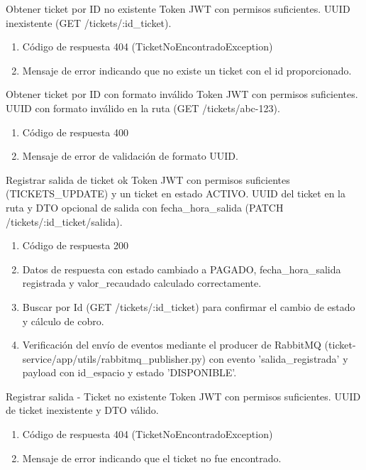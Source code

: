 {Obtener ticket por ID no existente}
{Token JWT con permisos suficientes.}
{UUID inexistente (GET /tickets/:id\_ticket).}
{\begin{enumerate} [leftmargin=*, nosep]
    \item Código de respuesta 404 (TicketNoEncontradoException)
    \item Mensaje de error indicando que no existe un ticket con el id proporcionado.
\end{enumerate}}

{Obtener ticket por ID con formato inválido}
{Token JWT con permisos suficientes.}
{UUID con formato inválido en la ruta (GET /tickets/abc-123).}
{\begin{enumerate} [leftmargin=*, nosep]
    \item Código de respuesta 400
    \item Mensaje de error de validación de formato UUID.
\end{enumerate}}

{Registrar salida de ticket ok}
{Token JWT con permisos suficientes (TICKETS\_UPDATE) y un ticket en estado ACTIVO.}
{UUID del ticket en la ruta y DTO opcional de salida con fecha\_hora\_salida (PATCH /tickets/:id\_ticket/salida).}
{\begin{enumerate} [leftmargin=*, nosep]
    \item Código de respuesta 200
    \item Datos de respuesta con estado cambiado a PAGADO, fecha\_hora\_salida registrada y valor\_recaudado calculado correctamente.
    \item Buscar por Id (GET /tickets/:id\_ticket) para confirmar el cambio de estado y cálculo de cobro.
    \item Verificación del envío de eventos mediante el producer de RabbitMQ (ticket-service/app/utils/rabbitmq\_publisher.py) con evento 'salida\_registrada' y payload con id\_espacio y estado 'DISPONIBLE'.
\end{enumerate}}

{Registrar salida - Ticket no existente}
{Token JWT con permisos suficientes.}
{UUID de ticket inexistente y DTO válido.}
{\begin{enumerate} [leftmargin=*, nosep]
    \item Código de respuesta 404 (TicketNoEncontradoException)
    \item Mensaje de error indicando que el ticket no fue encontrado.
\end{enumerate}}

